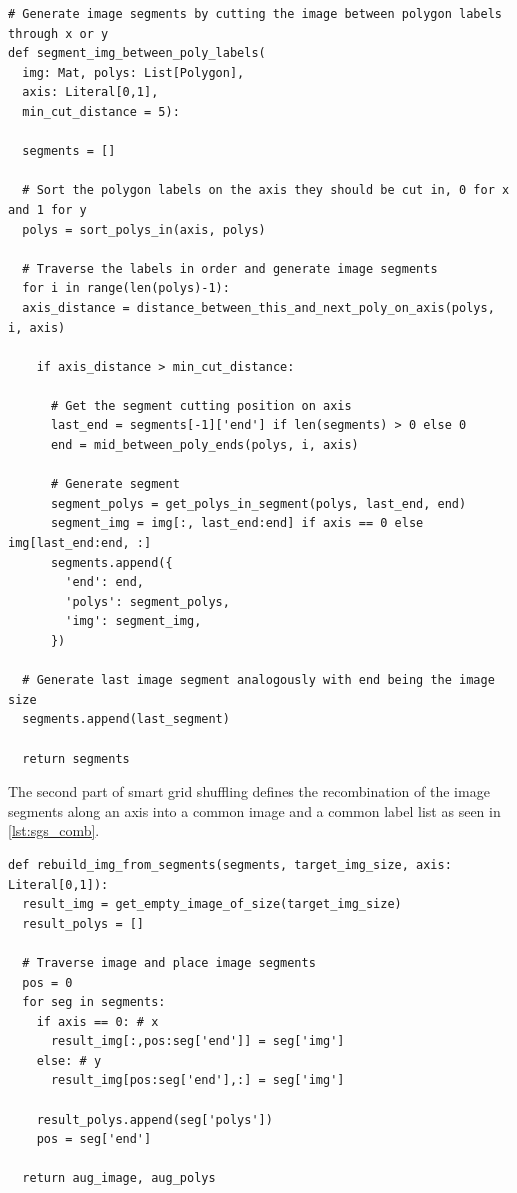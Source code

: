 \documentclass[10pt]{book}
\newenvironment{code}{\captionsetup{type=listing}}{}
\begin{document}

\begin{code}
\label{lst:sgs_cut}
\begin{verbatim}
# Generate image segments by cutting the image between polygon labels through x or y
def segment_img_between_poly_labels(
  img: Mat, polys: List[Polygon], 
  axis: Literal[0,1], 
  min_cut_distance = 5):

  segments = []
  
  # Sort the polygon labels on the axis they should be cut in, 0 for x and 1 for y
  polys = sort_polys_in(axis, polys)
  
  # Traverse the labels in order and generate image segments
  for i in range(len(polys)-1):
  axis_distance = distance_between_this_and_next_poly_on_axis(polys, i, axis)

    if axis_distance > min_cut_distance:

      # Get the segment cutting position on axis
      last_end = segments[-1]['end'] if len(segments) > 0 else 0
      end = mid_between_poly_ends(polys, i, axis)

      # Generate segment
      segment_polys = get_polys_in_segment(polys, last_end, end)
      segment_img = img[:, last_end:end] if axis == 0 else img[last_end:end, :]
      segments.append({
        'end': end,
        'polys': segment_polys,
        'img': segment_img,
      })

  # Generate last image segment analogously with end being the image size
  segments.append(last_segment)
  
  return segments
\end{verbatim}
\end{code}

The second part of smart grid shuffling defines the recombination of the image segments along an axis into a common image and a common label list as seen in \autoref{lst:sgs_comb}.

\begin{code}
\label{lst:sgs_comb}
\begin{verbatim}
def rebuild_img_from_segments(segments, target_img_size, axis: Literal[0,1]):
  result_img = get_empty_image_of_size(target_img_size)
  result_polys = []

  # Traverse image and place image segments
  pos = 0
  for seg in segments:
    if axis == 0: # x
      result_img[:,pos:seg['end']] = seg['img']
    else: # y
      result_img[pos:seg['end'],:] = seg['img']
        
    result_polys.append(seg['polys'])
    pos = seg['end']
    
  return aug_image, aug_polys
\end{verbatim}
\end{code}
\end{document}

